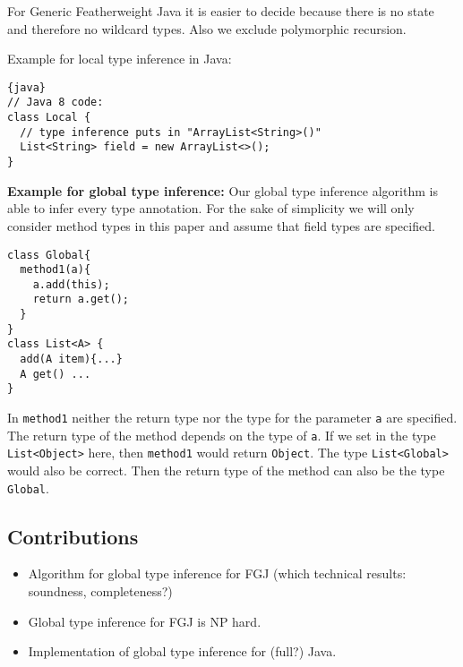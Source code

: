 For Generic Featherweight Java it is easier to decide because there is no state and therefore no wildcard types.
Also we exclude polymorphic recursion.

Example for local type inference in Java:
\begin{lstlisting}{java}
// Java 8 code:
class Local {
  // type inference puts in "ArrayList<String>()"
  List<String> field = new ArrayList<>();
}
\end{lstlisting}

\textbf{Example for global type inference:}
Our global type inference algorithm is able to infer every type annotation.
For the sake of simplicity we will only consider method types in this
paper and assume that field types are specified.
\begin{lstlisting}
class Global{
  method1(a){
    a.add(this);
    return a.get();
  }
}
class List<A> {
  add(A item){...}
  A get() ...
}
\end{lstlisting}
In \texttt{method1} neither the return type nor the type for the parameter \texttt{a} are specified.
The return type of the method depends on the type of \texttt{a}.
If we set in the type \texttt{List<Object>} here, then \texttt{method1} would return \texttt{Object}.
The type \texttt{List<Global>} would also be correct.
Then the return type of the method can also be the type
\texttt{Global}.

\subsection{Contributions}
\label{sec:contributions}

\begin{itemize}
\item Algorithm for global type inference for FGJ (which technical 
  results: soundness, completeness?)
\item Global type inference for FGJ is NP hard.
\item Implementation of global type inference for (full?) Java.
\end{itemize}



